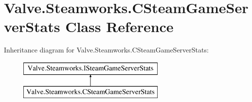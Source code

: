 \hypertarget{classValve_1_1Steamworks_1_1CSteamGameServerStats}{}\section{Valve.\+Steamworks.\+C\+Steam\+Game\+Server\+Stats Class Reference}
\label{classValve_1_1Steamworks_1_1CSteamGameServerStats}
Inheritance diagram for Valve.\+Steamworks.\+C\+Steam\+Game\+Server\+Stats\+:\begin{figure}[H]
\begin{center}
\leavevmode
\includegraphics[height=2.000000cm]{classValve_1_1Steamworks_1_1CSteamGameServerStats}
\end{center}
\end{figure}
